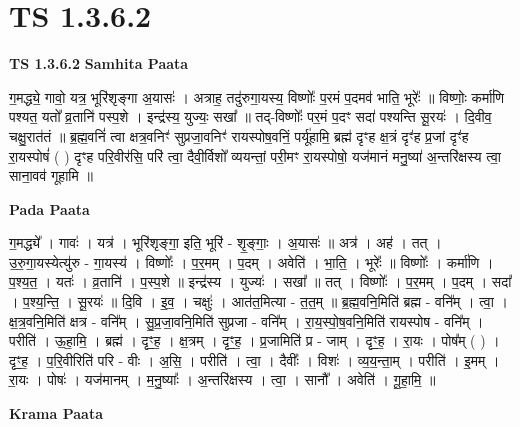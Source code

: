 \documentclass[17pt]{extarticle}
\begin{document}
\section*{ TS 1.3.6.2 }

\textbf{TS 1.3.6.2 } \newline
\textbf{Samhita Paata} \newline

ग॒मद्ध्ये॒ गावो॒ यत्र॒ भूरि॑शृङ्गा अ॒यासः॑ । अत्राह॒ तदु॑रुगा॒यस्य॒ विष्णोः᳚ प॒रमं प॒दमव॑ भाति॒ भूरेः᳚ ॥ विष्णोः॒ कर्मा॑णि पश्यत॒ यतो᳚ व्र॒तानि॑ पस्प॒शे । इन्द्र॑स्य॒ युज्यः॒ सखा᳚ ॥ तद्-विष्णोः᳚ पर॒मं प॒दꣳ सदा॑ पश्यन्ति सू॒रयः॑ । दि॒वीव॒ चक्षु॒रात॑तं ॥ ब्र॒ह्म॒वनिं॑ त्वा क्षत्र॒वनिꣳ॑ सुप्रजा॒वनिꣳ॑ रायस्पोष॒वनिं॒ पर्यू॑हामि॒ ब्रह्म॑ दृꣳह क्ष॒त्रं दृꣳ॑ह प्र॒जां दृꣳ॑ह रा॒यस्पोषं॑ ( ) दृꣳह परि॒वीर॑सि॒ परि॑ त्वा॒ दैवी॒र्विशो᳚ व्ययन्तां॒ परी॒मꣳ रा॒यस्पोषो॒ यज॑मानं मनु॒ष्या॑ अ॒न्तरि॑क्षस्य त्वा॒ साना॒वव॑ गूहामि ॥ \newline

\textbf{Pada Paata} \newline

ग॒मद्ध्ये᳚ । गावः॑ । यत्र॑ । भूरि॑शृङ्गा॒ इति॒ भूरि॑ - शृ॒ङ्गाः॒ । अ॒यासः॑ ॥ अत्र॑ । अह॑ । तत् । उ॒रु॒गा॒यस्येत्यु॑रु - गा॒यस्य॑ । विष्णोः᳚ । प॒र॒मम् । प॒दम् । अवेति॑ । भा॒ति॒ । भूरेः᳚ ॥ विष्णोः᳚ । कर्मा॑णि । प॒श्य॒त॒ । यतः॑ । व्र॒तानि॑ । प॒स्प॒शे ॥ इन्द्र॑स्य । युज्यः॑ । सखा᳚ ॥ तत् । विष्णोः᳚ । प॒र॒मम् । प॒दम् । सदा᳚ । प॒श्य॒न्ति॒ । सू॒रयः॑ ॥ दि॒वि । इ॒व॒ । चक्षुः॑ । आत॑त॒मित्या - त॒त॒म् ॥ ब्र॒ह्म॒वनि॒मिति॑ ब्रह्म - वनि᳚म् । त्वा॒ । क्ष॒त्र॒वनि॒मिति॑ क्षत्र - वनि᳚म् । सु॒प्र॒जा॒वनि॒मिति॑ सुप्रजा - वनि᳚म् । रा॒य॒स्पो॒ष॒वनि॒मिति॑ रायस्पोष - वनि᳚म् । परीति॑ । ऊ॒हा॒मि॒ । ब्रह्म॑ । दृꣳ॒॒ह॒ । क्ष॒त्रम् । दृꣳ॒॒ह॒ । प्र॒जामिति॑ प्र - जाम् । दृꣳ॒॒ह॒ । रा॒यः । पोष᳚म् ( ) । दृꣳ॒॒ह॒ । प॒रि॒वीरिति॑ परि - वीः । अ॒सि॒ । परीति॑ । त्वा॒ । दैवीः᳚ । विशः॑ । व्य॒य॒न्ता॒म् । परीति॑ । इ॒मम् । रा॒यः । पोषः॑ । यज॑मानम् । म॒नु॒ष्याः᳚ । अ॒न्तरि॑क्षस्य । त्वा॒ । सानौ᳚ । अवेति॑ । गू॒हा॒मि॒ ॥  \newline


\textbf{Krama Paata} \newline
\end{document}
